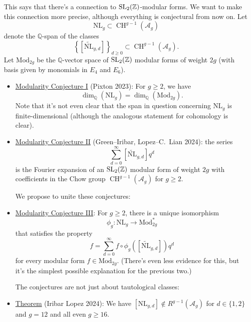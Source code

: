 \documentclass[reqno]{amsart} 
\begin{document}
This says that there's a connection to $\operatorname{SL}_2(\mathbb{Z})$-modular forms.  We want to make this connection more precise, although everything is conjectural from now on.  Let
\begin{equation*}
  \mathrm{N L}_g \subset \operatorname{CH}^{g - 1}(\mathcal{A}_g)
\end{equation*}
denote the $\mathbb{Q}$-span of the classes
\begin{equation*}
  \left\{[\tilde{\mathrm{N L}}_{g, d}] \right\}_{d \geq 0}
  \subset \operatorname{CH}^{g - 1}(\mathcal{A}_g).
\end{equation*}
Let $\mathrm{Mod}_{2 g}$ be the $\mathbb{Q}$-vector space of $\operatorname{SL}_2(\mathbb{Z})$ modular forms of weight $2 g$ (with basis given by monomials in $E_4$ and $E_6$).
\begin{itemize}
\item \underline{Modularity Conjecture I} (Pixton 2023): For $g \geq 2$, we have
  \begin{equation*}
    \dim_{\mathbb{Q}}(\mathrm{N L}_g) = \dim_{\mathbb{Q}}(\mathrm{Mod}_{2 g}).
  \end{equation*}
  Note that it's not even clear that the span in question concerning $\mathrm{N L}_g$ is finite-dimensional (although the analogous statement for cohomology is clear).
\item \underline{Modularity Conjecture II} (Green--Iribar, Lopez--C.\ Lian 2024): the series
  \begin{equation*}
    \sum_{d = 0}^\infty[\tilde{\mathrm{N L}}_{g, d}] q^{d}
  \end{equation*}
  is the Fourier expansion of an $\operatorname{SL}_2(\mathbb{Z})$ modular form of weight $2 g$ with coefficients in the Chow group $\operatorname{CH}^{g - 1}(\mathcal{A}_g)$ for $g \geq 2$.

  We propose to unite these conjectures:
\item \underline{Modularity Conjecture III}: For $g \geq 2$, there is a unique isomorphism
  \begin{equation*}
    \phi_g : \mathrm{N L}_{g} \rightarrow \mathrm{Mod}_{2 g}^\ast
  \end{equation*}
  that satisfies the property
  \begin{equation*}
    f = \sum_{d = 0}^\infty f \circ \phi_g \left([\tilde{\mathrm{N L}}_{g, d}] \right) q^{d}
  \end{equation*}
  for every modular form $f \in \mathrm{Mod}_{2 g}$.  (There's even less evidence for this, but it's the simplest possible explanation for the previous two.)

  The conjectures are not just about tautological classes:
\item \underline{Theorem} (Iribar Lopez 2024): We have $[\mathrm{N L}_{g, d}] \notin R^{g - 1}(\mathcal{A}_g)$ for $d \in \{1, 2\}$ and $g = 12$ and all even $g \geq 16$.
  
\end{itemize}
\end{document}
